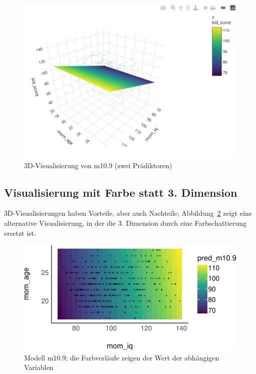 \documentclass[
  a4paper,
  DIV=11]{scrreprt}
\theoremstyle{definition}
\theoremstyle{remark}
\begin{document}
\begin{figure}

{\centering \includegraphics[width=1\textwidth,height=\textheight]{./img/m109-plotly.jpg}

}

\caption{\label{fig-m109-plotly}3D-Visualisierung von m10.9 (zwei
Prädiktoren)}

\end{figure}

\hypertarget{visualisierung-mit-farbe-statt-3.-dimension}{%
\subsection{Visualisierung mit Farbe statt 3.
Dimension}\label{visualisierung-mit-farbe-statt-3.-dimension}}

3D-Visualisierungen haben Vorteile, aber auch Nachteile;
Abbildung~\ref{fig-m109-color} zeigt eine alternative Visualisierung, in
der die 3. Dimension durch eine Farbschattierung ersetzt ist.

\begin{figure}

{\centering \includegraphics{./metrische-AV_files/figure-pdf/fig-m109-color-1.pdf}

}

\caption{\label{fig-m109-color}Modell m10.9; die Farbverläufe zeigen der
Wert der abhängigen Variablen}

\end{figure}
\end{document}
